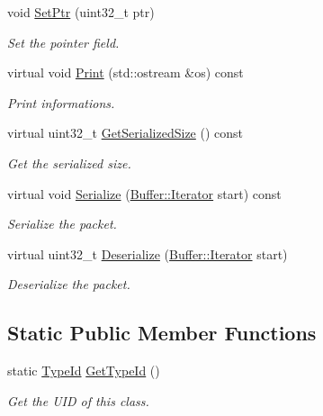 \begin{DoxyCompactItemize}
void \hyperlink{classns3_1_1Icmpv6ParameterError_a5e6dee59b2e9aacc5fa0857981cd4829}{Set\+Ptr} (uint32\+\_\+t ptr)
\begin{DoxyCompactList}\small\item\em Set the pointer field. \end{DoxyCompactList}\item 
virtual void \hyperlink{classns3_1_1Icmpv6ParameterError_a85e96dea4f1c6cd15910690cf18de234}{Print} (std\+::ostream \&os) const 
\begin{DoxyCompactList}\small\item\em Print informations. \end{DoxyCompactList}\item 
virtual uint32\+\_\+t \hyperlink{classns3_1_1Icmpv6ParameterError_a60c20ac447c09a0e629f3e526df3b92e}{Get\+Serialized\+Size} () const 
\begin{DoxyCompactList}\small\item\em Get the serialized size. \end{DoxyCompactList}\item 
virtual void \hyperlink{classns3_1_1Icmpv6ParameterError_a72ba841a8b45117a67cfb9a89ffd677b}{Serialize} (\hyperlink{classns3_1_1Buffer_1_1Iterator}{Buffer\+::\+Iterator} start) const 
\begin{DoxyCompactList}\small\item\em Serialize the packet. \end{DoxyCompactList}\item 
virtual uint32\+\_\+t \hyperlink{classns3_1_1Icmpv6ParameterError_a9adc32f79c63175a9dde08e017746794}{Deserialize} (\hyperlink{classns3_1_1Buffer_1_1Iterator}{Buffer\+::\+Iterator} start)
\begin{DoxyCompactList}\small\item\em Deserialize the packet. \end{DoxyCompactList}\end{DoxyCompactItemize}
\subsection*{Static Public Member Functions}
\begin{DoxyCompactItemize}
\item 
static \hyperlink{classns3_1_1TypeId}{Type\+Id} \hyperlink{classns3_1_1Icmpv6ParameterError_a4734a567a2a0eac0eba41fef48faec4d}{Get\+Type\+Id} ()
\begin{DoxyCompactList}\small\item\em Get the U\+ID of this class. \end{DoxyCompactList}\end{DoxyCompactItemize}
